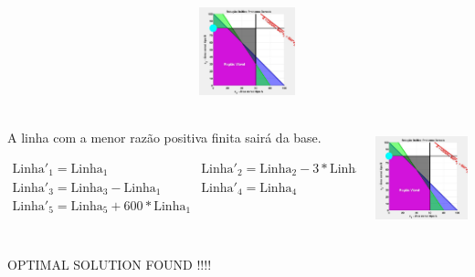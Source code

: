 \begin{frame}
{\begin{columns}
\begin{column}{0.5\textwidth}
		\end{column}
		\begin{column}{0.5\textwidth}
			\centering
			\includegraphics[width=2.8cm,height=2.8cm]{Exaustiva_7.jpeg}
		\end{column}
	\end{columns}	
	}
	{
	\begin{columns}
		\begin{column}{0.5\textwidth}
			\centering
			\begin{mdframed}[backgroundcolor=olive!80]
				A linha com a menor razão positiva finita sairá da base.
			\end{mdframed}
			$
				\begin{matrix}
					\scriptstyle \text{Linha}'_1 = \text{Linha}_1 &  
					\scriptstyle \text{Linha}'_2 = \text{Linha}_2 - 3*\text{Linha}_1 \\  
					\scriptstyle \text{Linha}'_3 = \text{Linha}_3 - \text{Linha}_1 &  
					\scriptstyle \text{Linha}'_4 = \text{Linha}_4 \\  
					\scriptstyle \text{Linha}'_5 = \text{Linha}_5 + 600*\text{Linha}_1 & \\
				\end{matrix}
			$
		\end{column}
		\begin{column}{0.5\textwidth}
			\centering
			\includegraphics[width=2.8cm,height=2.8cm]{Exaustiva_7.jpeg}
		\end{column}
	\end{columns}	
	}
	\only<9>
	{
	\begin{columns}
		\begin{column}{0.5\textwidth}
			\centering
			\begin{mdframed}[backgroundcolor=red!80]
				\centering
				OPTIMAL SOLUTION FOUND !!!!
			\end{mdframed}

\end{column}
\end{columns}}
\end{frame}
